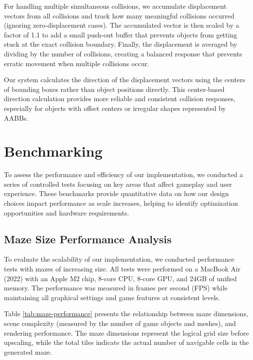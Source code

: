 \documentclass{article}
\begin{document}
For handling multiple simultaneous collisions, we accumulate displacement
vectors from all collisions and track how many meaningful collisions occurred
(ignoring zero-displacement cases). The accumulated vector is then scaled by a
factor of 1.1 to add a small push-out buffer that prevents objects from getting
stuck at the exact collision boundary. Finally, the displacement is averaged by
dividing by the number of collisions, creating a balanced response that
prevents erratic movement when multiple collisions occur.

Our system calculates the direction of the displacement vectors using the
centers of bounding boxes rather than object positions directly. This
center-based direction calculation provides more reliable and consistent
collision responses, especially for objects with offset centers or irregular
shapes represented by AABBs.


\section{Benchmarking}\label{sec:benchmarking}
To assess the performance and efficiency of our implementation, we conducted a series of controlled tests focusing on key areas that affect gameplay and user experience. These benchmarks provide quantitative data on how our design choices impact performance as scale increases, helping to identify optimization opportunities and hardware requirements.

\subsection{Maze Size Performance Analysis}
To evaluate the scalability of our implementation, we conducted performance tests with mazes of increasing size. All tests were performed on a MacBook Air (2022) with an Apple M2 chip, 8-core CPU, 8-core GPU, and 24GB of unified memory. The performance was measured in frames per second (FPS) while maintaining all graphical settings and game features at consistent levels.

Table \ref{tab:maze-performance} presents the relationship between maze dimensions, scene complexity (measured by the number of game objects and meshes), and rendering performance. The maze dimensions represent the logical grid size before upscaling, while the total tiles indicate the actual number of navigable cells in the generated maze.
\end{document}
